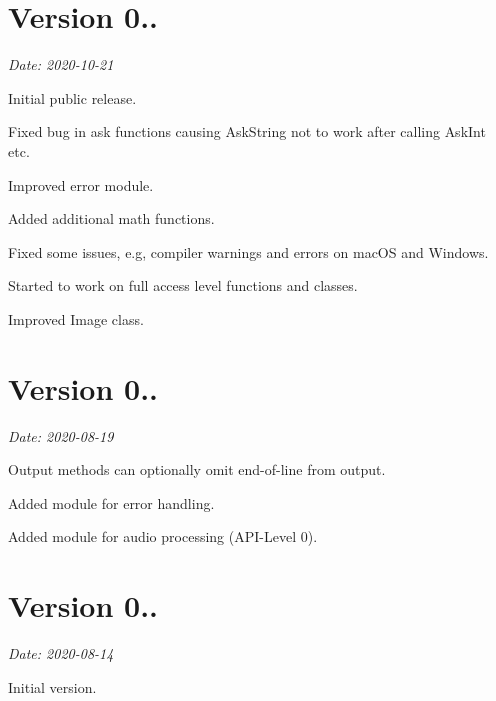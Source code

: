 \section*{Version 0..}

{\itshape Date\+: 2020-\/10-\/21}


\begin{DoxyItemize}
\item Initial public release.
\item Fixed bug in ask functions causing {\ttfamily Ask\+String} not to work after calling {\ttfamily Ask\+Int} etc.
\item Improved error module.
\item Added additional math functions.
\item Fixed some issues, e.\+g, compiler warnings and errors on mac\+OS and Windows.
\item Started to work on full access level functions and classes.
\item Improved Image class.
\end{DoxyItemize}

\section*{Version 0..}

{\itshape Date\+: 2020-\/08-\/19}


\begin{DoxyItemize}
\item Output methods can optionally omit end-\/of-\/line from output.
\item Added module for error handling.
\item Added module for audio processing (A\+P\+I-\/\+Level 0).
\end{DoxyItemize}

\section*{Version 0..}

{\itshape Date\+: 2020-\/08-\/14}


\begin{DoxyItemize}
\item Initial version. 
\end{DoxyItemize}